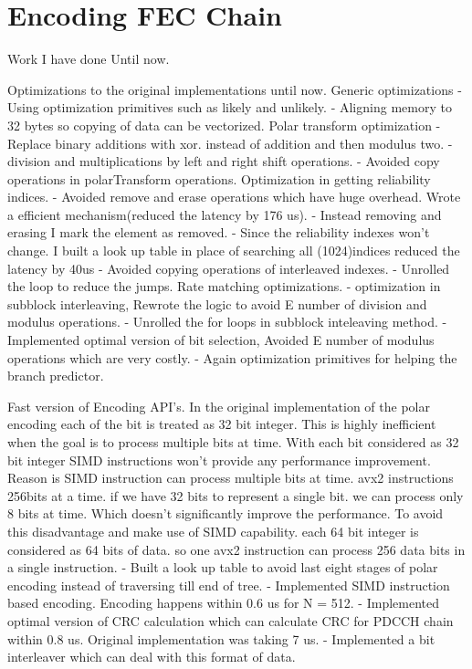 \chapter{Encoding FEC Chain} \label{chap:encoder}


Work I have done Until now.

Optimizations to the original implementations until now.
Generic optimizations
- Using optimization primitives such as likely and unlikely.
- Aligning memory to 32 bytes so copying of data can be vectorized.
Polar transform optimization	
- Replace binary additions with xor. instead of addition and then modulus two.
- division and multiplications by left and right shift operations.
- Avoided copy operations in polarTransform operations.
Optimization in getting reliability indices.
- Avoided remove and erase operations which have huge overhead. Wrote a efficient mechanism(reduced the latency by 176 us).
- Instead removing and erasing I mark the element as removed.
- Since the reliability indexes won't change. I built a look up table in place of searching all (1024)indices reduced the latency by 40us
- Avoided copying operations of interleaved indexes.
- Unrolled the loop to reduce the jumps.
Rate matching optimizations.
- optimization in subblock interleaving, Rewrote the logic to avoid E number of division and modulus operations.
- Unrolled the for loops in subblock inteleaving method.
- Implemented optimal version of bit selection, Avoided E number of modulus operations which are very costly.
- Again optimization primitives for helping the branch predictor.


Fast version of Encoding API's.
In the original implementation of the polar encoding each of the bit is treated as 32 bit integer. This is highly inefficient
when the goal is to process multiple bits at time. With each bit considered as 32 bit integer SIMD instructions won't provide
any performance improvement. Reason is SIMD instruction can process multiple bits at time. avx2 instructions 256bits at a time.
if we have 32 bits to represent a single bit. we can process only 8 bits at time. Which doesn't significantly improve the
performance. To avoid this disadvantage and make use of SIMD capability. each 64 bit integer is considered as 64 bits of data.
so one avx2 instruction can process 256 data bits in a single instruction.
- Built a look up table to avoid last eight stages of polar encoding instead of traversing till end of tree.
- Implemented SIMD instruction based encoding. Encoding happens within 0.6 us for N = 512.
- Implemented optimal version of CRC calculation which can calculate CRC for PDCCH chain within 0.8 us. Original implementation was taking 7 us.
- Implemented a bit interleaver which can deal with this format of data.


